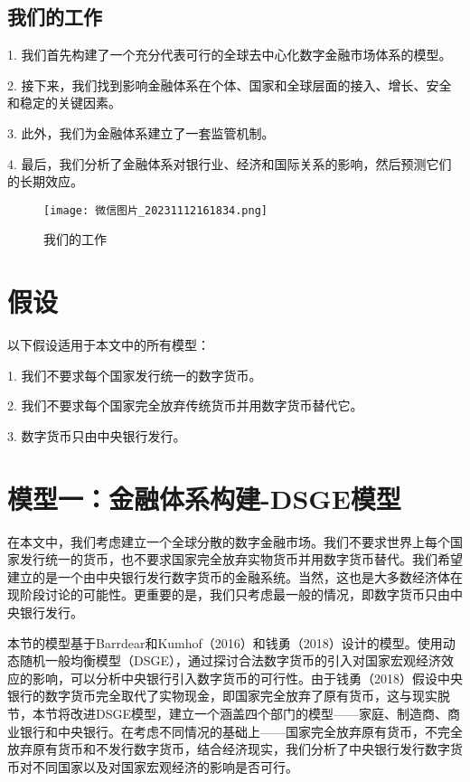 \documentclass[withoutpreface,bwprint]{cumcmthesis} %
\begin{document}
\subsection{我们的工作}

1. 我们首先构建了一个充分代表可行的全球去中心化数字金融市场体系的模型。

2. 接下来，我们找到影响金融体系在个体、国家和全球层面的接入、增长、安全和稳定的关键因素。

3. 此外，我们为金融体系建立了一套监管机制。

4. 最后，我们分析了金融体系对银行业、经济和国际关系的影响，然后预测它们的长期效应。

\begin{figure}[htbp]  %
	\centering  %
	\texttt{[image: 微信图片\_20231112161834.png]} %
	\caption{我们的工作} %
\end{figure}

\section{假设}

以下假设适用于本文中的所有模型：

1. 我们不要求每个国家发行统一的数字货币。

2. 我们不要求每个国家完全放弃传统货币并用数字货币替代它。

3. 数字货币只由中央银行发行。

\section{模型一：金融体系构建-DSGE模型}

在本文中，我们考虑建立一个全球分散的数字金融市场。我们不要求世界上每个国家发行统一的货币，也不要求国家完全放弃实物货币并用数字货币替代。我们希望建立的是一个由中央银行发行数字货币的金融系统。当然，这也是大多数经济体在现阶段讨论的可能性。更重要的是，我们只考虑最一般的情况，即数字货币只由中央银行发行。

本节的模型基于Barrdear和Kumhof（2016）\cite{barrdear2016macroeconomics}和钱勇（2018）\cite{qian2019economic}设计的模型。使用动态随机一般均衡模型（DSGE），通过探讨合法数字货币的引入对国家宏观经济效应的影响，可以分析中央银行引入数字货币的可行性。由于钱勇（2018）\cite{qian2019economic}假设中央银行的数字货币完全取代了实物现金，即国家完全放弃了原有货币，这与现实脱节，本节将改进DSGE模型，建立一个涵盖四个部门的模型——家庭、制造商、商业银行和中央银行。在考虑不同情况的基础上——国家完全放弃原有货币，不完全放弃原有货币和不发行数字货币，结合经济现实，我们分析了中央银行发行数字货币对不同国家以及对国家宏观经济的影响是否可行。
\end{document}
